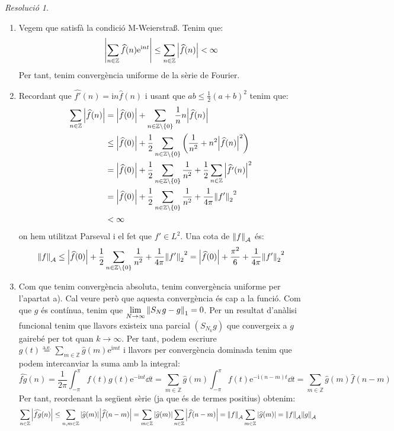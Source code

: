 \documentclass[10pt,a4paper]{article}
\newcommand{\ZZ}{\ensuremath{\mathbb{Z}}} %
\newcommand{\ii}{\mathrm{i}} %
\theoremstyle{definition}
\theoremstyle{remark}
\newtheorem*{res}{Resolució}
\renewcommand{\exp}[1]{\mathrm{e}^{#1}} %
\begin{document}
\begin{res}
  \hfill
  \begin{enumerate}
    \item  Vegem que satisfà la condició M-Weierstra\ss. Tenim que:
          $$\left|\sum_{n\in\ZZ}\widehat{f}(n)\exp{\ii n t} \right|\leq\sum_{n\in\ZZ}\abs{\widehat{f}(n)}< \infty$$
          Per tant, tenim convergència uniforme de la sèrie de Fourier.
    \item Recordant que $\widehat{f'}(n)=\ii n \widehat{f}(n)$ i usant que $ab\leq\frac{1}{2}{\left(a+b\right)}^2$ tenim que:
          \begin{align*}
            \sum_{n\in\ZZ}\abs{\widehat{f}(n)} & =\abs{\widehat{f}(0)}+ \sum_{n\in\ZZ\setminus\{0\}}\frac{1}{n}n\abs{\widehat{f}(n)}                                         \\
                                               & \leq\abs{\widehat{f}(0)}+\frac{1}{2}\sum_{n\in\ZZ\setminus\{0\}}\left(\frac{1}{n^2} + n^2\abs{\widehat{f}(n)}^2\right)      \\
                                               & =\abs{\widehat{f}(0)}+\frac{1}{2}\sum_{n\in\ZZ\setminus\{0\}}\frac{1}{n^2}+\frac{1}{2}\sum_{n\in\ZZ}\abs{\widehat{f'}(n)}^2 \\
                                               & =\abs{\widehat{f}(0)}+\frac{1}{2}\sum_{n\in\ZZ\setminus\{0\}}\frac{1}{n^2}+\frac{1}{4\pi}{\norm{f'}_2}^2                    \\
                                               & <\infty
          \end{align*}
          on hem utilitzat Parseval i el fet que $f'\in L^2$. Una cota de $\norm{f}_\mathcal{A}$ és:
          $$\norm{f}_\mathcal{A}\leq\abs{\widehat{f}(0)}+\frac{1}{2}\sum_{n\in\ZZ\setminus\{0\}}\frac{1}{n^2}+\frac{1}{4\pi}{\norm{f'}_2}^2 =\abs{\widehat{f}(0)}+\frac{\pi^2}{6}+\frac{1}{4\pi}{\norm{f'}_2}^2 $$
    \item Com que tenim convergència absoluta, tenim convergència uniforme per l'apartat a). Cal veure però que aquesta convergència és cap a la funció. Com que $g$ és contínua, tenim que $\displaystyle\lim_{N\to\infty}\norm{S_Ng-g}_1=0$. Per un resultat d'anàlisi funcional tenim que llavors existeix una parcial $(S_{N_k}g)$ que convergeix a $g$ gairebé per tot quan $k\to\infty$. Per tant, podem escriure $g(t)\overset{\mathrm{a.e.}}{=}\sum_{m\in\ZZ}\widehat{g}(m)\exp{\ii m t}$ i llavors per convergència dominada tenim que podem intercanviar la suma amb la integral:
          $$\widehat{fg}(n)=\frac{1}{2\pi}\int_{-\pi}^\pi f(t)g(t)\exp{-\ii n t}\dd{t}=\sum_{m\in\ZZ}\widehat{g}(m)\int_{-\pi}^\pi f(t)\exp{-\ii (n-m) t}\dd{t}=\sum_{m\in\ZZ}\widehat{g}(m)\widehat{f}(n-m)$$
          Per tant, reordenant la següent sèrie (ja que és de termes positius) obtenim:
          $$\sum_{n\in\ZZ}\abs{\widehat{fg}(n)}\leq\sum_{n,m\in\ZZ}\abs{\widehat{g}(m)}\abs{\widehat{f}(n-m)}=\sum_{m\in\ZZ}\abs{\widehat{g}(m)}\sum_{n\in\ZZ}\abs{\widehat{f}(n-m)}=\norm{f}_\mathcal{A}\sum_{m\in\ZZ}\abs{\widehat{g}(m)}=\norm{f}_{\mathcal{A}}\norm{g}_{\mathcal{A}}$$
  \end{enumerate}

\end{res}
\end{document}
